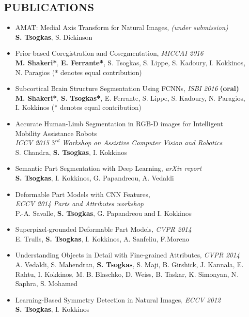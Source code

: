 \documentclass[margin]{res}
\begin{document}
\begin{resume}
\section{PUBLICATIONS} 
	\begin{itemize}
	\item   AMAT: Medial Axis Transform for Natural Images, \emph{(under submission)}\\
		  \textbf{S. Tsogkas}, S. Dickinson 
	\item  Prior-based Coregistration and Cosegmentation, \emph{MICCAI 2016}\\
		  \textbf{M. Shakeri*}, \textbf{E. Ferrante*}, S. Tsogkas, S. Lippe, S. Kadoury, I. Kokkinos,  N. Paragios (* denotes equal contribution)   
	\item  Subcortical Brain Structure Segmentation Using FCNNs, \emph{ISBI 2016} \textbf{(oral)}\\
		  \textbf{M. Shakeri*}, \textbf{S. Tsogkas*}, E. Ferrante, S. Lippe, S. Kadoury, N. Paragios, I. Kokkinos (* denotes equal contribution)   
	\item   Accurate Human-Limb Segmentation in RGB-D images for Intelligent Mobility Assistance Robots\\
		   \emph{ICCV 2015 $3^{rd}$ Workshop on Assistive Computer Vision and Robotics}\\
		  S. Chandra, \textbf{S. Tsogkas}, I. Kokkinos
	\item   Semantic Part Segmentation with Deep Learning, \emph{arXiv report}\\
		  \textbf{S. Tsogkas}, I. Kokkinos, G. Papandreou, A. Vedaldi 
	\item  Deformable Part Models with CNN Features,\\ \emph{ECCV 2014 Parts and Attributes workshop}\\
	  P.-A. Savalle, \textbf{S. Tsogkas}, G. Papandreou and I. Kokkinos 
	\item  Superpixel-grounded Deformable Part Models, \emph{CVPR 2014}\\
		  E. Trulls, \textbf{S. Tsogkas}, I. Kokkinos, A. Sanfeliu, F.Moreno
	\item Understanding Objects in Detail with Fine-grained Attributes, \emph{CVPR 2014} \\
	A. Vedaldi, S. Mahendran, \textbf{S. Tsogkas}, S. Maji, B. Girshick, J. Kannala, E. Rahtu, I. Kokkinos, M. B. Blaschko, D. Weiss, B. Taskar, K. Simonyan, N. Saphra, S. Mohamed 
	\item Learning-Based Symmetry Detection in Natural Images, \emph{ECCV 2012} \\
		  \textbf{S. Tsogkas}, I. Kokkinos
	\end{itemize}


\end{resume}
\end{document}
